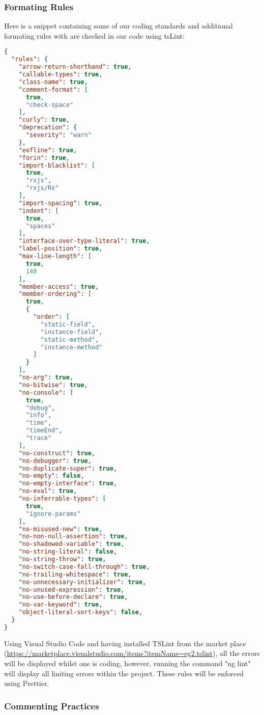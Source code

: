 \documentclass[11pt]{article}
\begin{document}
\subsubsection{Formating Rules}

Here is a snippet containing some of our coding standards and additional formating rules with are checked in our code using tsLint:
\begin{lstlisting}[language=json,firstnumber=1]
{
  "rules": {
    "arrow-return-shorthand": true,
    "callable-types": true,
    "class-name": true,
    "comment-format": [
      true,
      "check-space"
    ],
    "curly": true,
    "deprecation": {
      "severity": "warn"
    },
    "eofline": true,
    "forin": true,
    "import-blacklist": [
      true,
      "rxjs",
      "rxjs/Rx"
    ],
    "import-spacing": true,
    "indent": [
      true,
      "spaces"
    ],
    "interface-over-type-literal": true,
    "label-position": true,
    "max-line-length": [
      true,
      140
    ],
    "member-access": true,
    "member-ordering": [
      true,
      {
        "order": [
          "static-field",
          "instance-field",
          "static-method",
          "instance-method"
        ]
      }
    ],
    "no-arg": true,
    "no-bitwise": true,
    "no-console": [
      true,
      "debug",
      "info",
      "time",
      "timeEnd",
      "trace"
    ],
    "no-construct": true,
    "no-debugger": true,
    "no-duplicate-super": true,
    "no-empty": false,
    "no-empty-interface": true,
    "no-eval": true,
    "no-inferrable-types": [
      true,
      "ignore-params"
    ],
    "no-misused-new": true,
    "no-non-null-assertion": true,
    "no-shadowed-variable": true,
    "no-string-literal": false,
    "no-string-throw": true,
    "no-switch-case-fall-through": true,
    "no-trailing-whitespace": true,
    "no-unnecessary-initializer": true,
    "no-unused-expression": true,
    "no-use-before-declare": true,
    "no-var-keyword": true,
    "object-literal-sort-keys": false,
  }
}
\end{lstlisting}

Using Visual Studio Code and having installed TSLint from the market place (\url{https://marketplace.visualstudio.com/items?itemName=eg2.tslint}), all the errors will be displayed whilst one is coding, however, running the command "ng lint" will display all liniting errors within the project. These rules will be enforced using Prettier.

\subsubsection{Commenting Practices}
\end{document}

